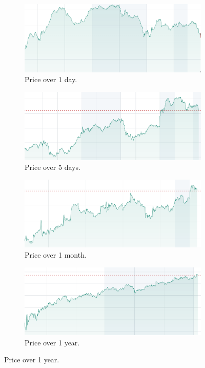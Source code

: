 \begin{itemize}
\begin{figure}[htbp]
    \centering
    \begin{subfigure}{0.45\textwidth}
        \centering
        \includegraphics[width=\linewidth]{img/1d.png}
        \caption{Price over 1 day.}
    \end{subfigure}
    \hfill
    \begin{subfigure}{0.45\textwidth}
        \centering
        \includegraphics[width=\linewidth]{img/5d.png}
        \caption{Price over 5 days.}
    \end{subfigure}

    \begin{subfigure}{0.45\textwidth}
        \centering
        \includegraphics[width=\linewidth]{img/1m.png}
        \caption{Price over 1 month.}
    \end{subfigure}
    \hfill
    \begin{subfigure}{0.45\textwidth}
        \centering
        \includegraphics[width=\linewidth]{img/1y.png}
        \caption{Price over 1 year.}
    \end{subfigure}


\end{figure}
\end{itemize}
